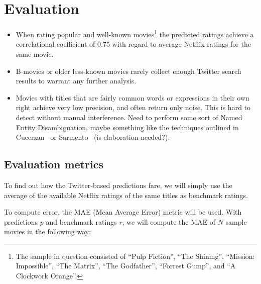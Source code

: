 
\chapter{Evaluation} %

\label{Chapter5}




\begin{itemize}
  \item When rating popular and well-known movies\footnote{The sample in question consisted of ``Pulp Fiction'', ``The Shining'', ``Mission: Impossible'', ``The Matrix'', ``The Godfather'', ``Forrest Gump'', and ``A Clockwork Orange''.} the predicted ratings achieve a correlational coefficient of 0.75 with regard to average Netflix ratings for the same movie.
  \item B-movies or older less-known movies rarely collect enough Twitter search results to warrant any further analysis.
  \item Movies with titles that are fairly common words or expressions in their own right achieve very low precision, and often return only noise. This is hard to detect without manual interference. Need to perform some sort of Named Entity Disambiguation, maybe something like the techniques outlined in Cucerzan~\cite{NamedEntityDisambiguationWiki} or Sarmento~\cite{NamedEntityDisambiguationWS} (is elaboration needed?).
\end{itemize}

\section{Evaluation metrics} %
\label{sec:evaluation_metrics}

To find out how the Twitter-based predictions fare, we will simply use the average of the available Netflix ratings of the same titles as benchmark ratings.

To compute error, the MAE (Mean Average Error) metric will be used. With predictions $p$ and benchmark ratings $r$, we will compute the MAE of $N$ sample movies in the following way:

